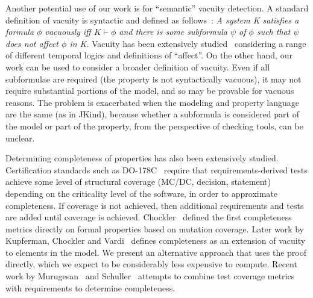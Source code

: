 Another potential use of our work is for ``semantic'' vacuity detection.  A standard definition of vacuity is syntactic and defined as follows~\cite{Kupferman:2006:SCF}: {\em A system K satisfies a formula $\phi$ vacuously iff $K \vdash \phi$ and there is some subformula $\psi$ of $\phi$ such that $\psi$ does not affect $\phi$ in K}.  Vacuity has been extensively studied~\cite{Gurfinkel:2012:RVB,Chockler2008,DBLP:Ben-DavidK13,Kupferman:2006:SCF,Chockler:2007,Beer1997} considering a range of different temporal logics and definitions of ``affect''.  On the other hand, our work can be used to consider a broader definition of vacuity.  Even if all subformulae are required (the property is not syntactically vacuous), it may not require substantial portions of the model, and so may be provable for vacuous reasons.  The problem is exacerbated when the modeling and property language are the same (as in JKind), because whether a subformula is considered part of the model or part of the property, from the perspective of checking tools, can be unclear.

Determining completeness of properties has also been extensively studied. Certification standards such as DO-178C~\cite{DO178C} require that requirements-derived tests achieve some level of structural coverage (MC/DC, decision, statement) depending on the criticality level of the software, in order to approximate completeness.  If coverage is not achieved, then additional requirements and tests are added until coverage is achieved.  Chockler~\cite{chockler_coverage_2003} defined the first completeness metrics directly on formal properties based on mutation coverage.  Later work by Kupferman, Chockler and Vardi~\cite{Kupferman:2006:SCF} defines completeness as an extension of vacuity to elements in the model.  We present an alternative approach that uses the proof directly, which we expect to be considerably less expensive to compute.  Recent work by Murugesan~\cite{murugesan2015we} and Schuller~\cite{schuler_assessing_2011} attempts to combine test coverage metrics with requirements to determine completeness.




\iffalse
\begin{itemize}
    \item MUS's : checked
    \item Work on Alloy: checked
    \item Work that Teme pointed us to : will be added
    \item Anything else Elaheh has found : \%60 checked
\end{itemize}
\fi

